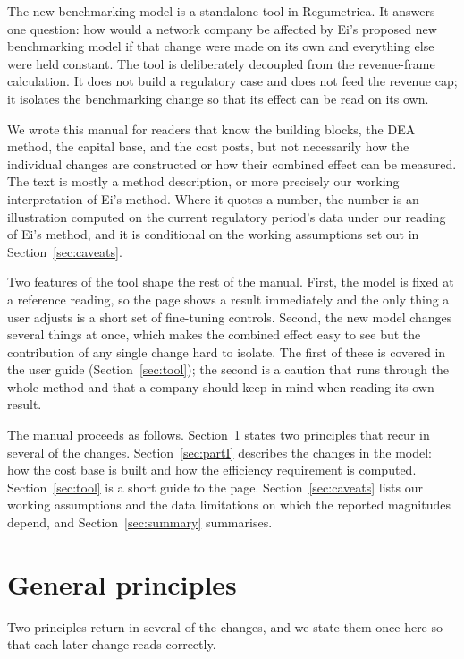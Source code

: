 The new benchmarking model is a standalone tool in Regumetrica. It answers one question: how
would a network company be affected by Ei's proposed new benchmarking model if that change were made on its own
and everything else were held constant. The tool is deliberately decoupled from the
revenue-frame calculation. It does not build a regulatory case and does not feed the revenue
cap; it isolates the benchmarking change so that its effect can be read on its own.

We wrote this manual for readers that know the building blocks, the DEA method, the
capital base, and the cost posts, but not necessarily how the individual changes are constructed
or how their combined effect can be measured. The text is mostly a method description, or more
precisely our working interpretation of Ei's method. Where it
quotes a number, the number is an illustration computed on the current regulatory period's data
under our reading of Ei's method, and it is conditional on the working assumptions set out in
Section~\ref{sec:caveats}.

Two features of the tool shape the rest of the manual. First, the model is fixed at a reference
reading, so the page shows a result immediately and the only thing a user adjusts is a short set
of fine-tuning controls. Second, the new model changes several things at once, which makes the
combined effect easy to see but the contribution of any single change hard to isolate. The first
of these is covered in the user guide (Section~\ref{sec:tool}); the second is a caution that runs
through the whole method and that a company should keep in mind when reading its own result.

The manual proceeds as follows. Section~\ref{sec:principles} states two principles that recur in
several of the changes. Section~\ref{sec:partI} describes the changes in the model: how the cost
base is built and how the efficiency requirement is computed. Section~\ref{sec:tool} is a short
guide to the page. Section~\ref{sec:caveats} lists our working assumptions and the data
limitations on which the reported magnitudes depend, and Section~\ref{sec:summary} summarises.

\section{General principles}
\label{sec:principles}

Two principles return in several of the changes, and we state them once here so that each later
change reads correctly.

